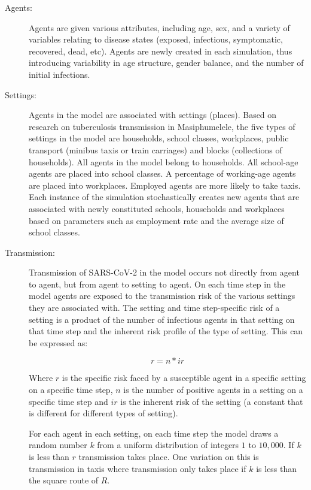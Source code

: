 \documentclass{article}
\begin{document}
\begin{description}

\item[Agents:] Agents are given various attributes, including age, sex, and a
  variety of variables relating to disease states (exposed, infectious,
  symptomatic, recovered, dead, etc). Agents are newly created in each
  simulation, thus introducing variability in age structure, gender balance, and
  the number of initial infections.

\item[Settings:] Agents in the model are associated with settings
  (places). Based on research on tuberculosis transmission in Masiphumelele, the
  five types of settings in the model are households, school classes,
  workplaces, public transport (minibus taxis or train carriages) and blocks
  (collections of households).\cite{Andrews2014} All agents in the model belong
  to households. All school-age agents are placed into school classes. A
  percentage of working-age agents are placed into workplaces. Employed agents
  are more likely to take taxis. Each instance of the simulation stochastically
  creates new agents that are associated with newly constituted schools,
  households and workplaces based on parameters such as employment rate and the
  average size of school classes.

\item[Transmission:] Transmission of SARS-CoV-2 in the model occurs not directly
  from agent to agent, but from agent to setting to agent. On each time step in
  the model agents are exposed to the transmission risk of the various settings
  they are associated with. The setting and time step-specific risk of a setting
  is a product of the number of infectious agents in that setting on that time
  step and the inherent risk profile of the type of setting. This can be
  expressed as:

  \begin{equation*}
    r = n * ir
  \end{equation*}

  Where $r$ is the specific risk faced by a susceptible agent in a specific
  setting on a specific time step, $n$ is the number of positive agents in a
  setting on a specific time step and $ir$ is the inherent risk of the setting (a
  constant that is different for different types of setting).

  For each agent in each setting, on each time step the model draws a random
  number $k$ from a uniform distribution of integers $1$ to $10,000$. If $k$ is less
  than $r$ transmission takes place. One variation on this is transmission in
  taxis where transmission only takes place if $k$ is less than the square route
  of $R$.


\end{description}
\end{document}
